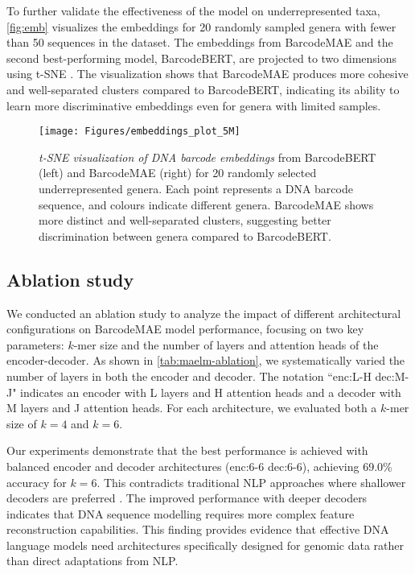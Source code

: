 

To further validate the effectiveness of the model on underrepresented taxa, \autoref{fig:emb} visualizes the embeddings for 20 randomly sampled genera with fewer than 50 sequences in the dataset.  The embeddings from BarcodeMAE and the second best-performing model, BarcodeBERT, are projected to two dimensions using t-SNE \citep{vanDerMaaten2008}. The visualization shows that BarcodeMAE produces more cohesive and well-separated clusters compared to BarcodeBERT, indicating its ability to learn more discriminative embeddings even for genera with limited samples. 


\begin{figure}[h]
    \centering \texttt{[image: Figures/embeddings\_plot\_5M]}
    \caption{%
    \textit{t-SNE visualization of DNA barcode embeddings} from BarcodeBERT (left) and BarcodeMAE (right) for 20 randomly selected underrepresented genera. Each point represents a DNA barcode sequence, and colours indicate different genera. BarcodeMAE shows more distinct and well-separated clusters, suggesting better discrimination between genera compared to BarcodeBERT.}
    \label{fig:emb}
\end{figure}


\subsection{Ablation study}
We conducted an ablation study to analyze the impact of different architectural configurations on BarcodeMAE model performance, focusing on two key parameters: $k$-mer size and the number of layers and attention heads of the encoder-decoder. As shown in \autoref{tab:maelm-ablation}, we systematically varied the number of layers in both the encoder and decoder. The notation ``enc:L-H dec:M-J" indicates an encoder with L layers and H attention heads and a decoder with M layers and J attention heads. For each architecture, we evaluated both a $k$-mer size of $k=4$ and $k=6$.




Our experiments demonstrate that the best performance is achieved with balanced encoder and decoder architectures (enc:6-6 dec:6-6), achieving 69.0\% accuracy for $k=6$. This contradicts traditional NLP approaches where shallower decoders are preferred \citep{meng2024maelm}. The improved performance with deeper decoders indicates that DNA sequence modelling requires more complex feature reconstruction capabilities. This finding provides evidence that effective DNA language models need architectures specifically designed for genomic data rather than direct adaptations from NLP.



